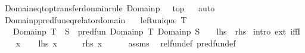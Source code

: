 \begin{isabellebody}
\isadelimproof
%
\endisadelimproof
\isanewline
\isanewline
{}\isamarkupfalse%
\ Domain{\isacharunderscore}{\kern0pt}eq{\isacharunderscore}{\kern0pt}top{\isacharbrackleft}{\kern0pt}transfer{\isacharunderscore}{\kern0pt}domain{\isacharunderscore}{\kern0pt}rule{\isacharbrackright}{\kern0pt}{\isacharcolon}{\kern0pt}\ {\isachardoublequoteopen}Domainp\ {\isacharparenleft}{\kern0pt}{\isacharequal}{\kern0pt}{\isacharparenright}{\kern0pt}\ {\isacharequal}{\kern0pt}\ top{\isachardoublequoteclose}%
\isadelimproof
\ %
\endisadelimproof
%
\isatagproof
{}\isamarkupfalse%
\ auto%
\endisatagproof
{\isafoldproof}%
%
\isadelimproof
%
\endisadelimproof
\isanewline
\isanewline
{}\isamarkupfalse%
\ Domainp{\isacharunderscore}{\kern0pt}pred{\isacharunderscore}{\kern0pt}fun{\isacharunderscore}{\kern0pt}eq{\isacharbrackleft}{\kern0pt}relator{\isacharunderscore}{\kern0pt}domain{\isacharbrackright}{\kern0pt}{\isacharcolon}{\kern0pt}\isanewline
\ \ \ {\isachardoublequoteopen}left{\isacharunderscore}{\kern0pt}unique\ T{\isachardoublequoteclose}\isanewline
\ \ \ {\isachardoublequoteopen}Domainp\ {\isacharparenleft}{\kern0pt}T\ {\isacharequal}{\kern0pt}{\isacharequal}{\kern0pt}{\isacharequal}{\kern0pt}{\isachargreater}{\kern0pt}\ S{\isacharparenright}{\kern0pt}\ {\isacharequal}{\kern0pt}\ pred{\isacharunderscore}{\kern0pt}fun\ {\isacharparenleft}{\kern0pt}Domainp\ T{\isacharparenright}{\kern0pt}\ {\isacharparenleft}{\kern0pt}Domainp\ S{\isacharparenright}{\kern0pt}{\isachardoublequoteclose}\ \ \ {\isacharparenleft}{\kern0pt}\ {\isachardoublequoteopen}{\isacharquery}{\kern0pt}lhs\ {\isacharequal}{\kern0pt}\ {\isacharquery}{\kern0pt}rhs{\isachardoublequoteclose}{\isacharparenright}{\kern0pt}\isanewline
%
\isadelimproof
%
\endisadelimproof
%
\isatagproof
{}\isamarkupfalse%
\ {\isacharparenleft}{\kern0pt}intro\ ext\ iffI{\isacharparenright}{\kern0pt}\isanewline
\ \ \isamarkupfalse%
\ x\isanewline
\ \ \isamarkupfalse%
\ {\isachardoublequoteopen}{\isacharquery}{\kern0pt}lhs\ x{\isachardoublequoteclose}\isanewline
\ \ \isamarkupfalse%
\ \isamarkupfalse%
\ {\isachardoublequoteopen}{\isacharquery}{\kern0pt}rhs\ x{\isachardoublequoteclose}\isanewline
\ \ \ \ \isamarkupfalse%
\ assms\ \isamarkupfalse%
\ rel{\isacharunderscore}{\kern0pt}fun{\isacharunderscore}{\kern0pt}def\ pred{\isacharunderscore}{\kern0pt}fun{\isacharunderscore}{\kern0pt}def\ \isamarkupfalse%

\end{isabellebody}
